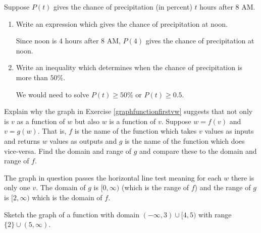 \documentclass{ximera}
\begin{document}
\begin{problem}
Suppose $P(t)$ gives the chance of precipitation (in percent)  $t$ hours after 8 AM.

\begin{enumerate}

\item  Write an expression which gives the chance of precipitation at noon.

\begin{solution}
Since noon is $4$ hours after 8 AM, $P(4)$ gives the chance of precipitation at noon.
\end{solution}

\item  Write an inequality which determines when the chance of precipitation is more than $50 \%$.

\begin{solution}
We would need to solve $P(t) \geq 50 \%$ or $P(t) \geq 0.5$.
\end{solution}

\end{enumerate}
\end{problem}

\begin{problem}
Explain why the graph in  Exercise \ref{graphfunctionfirstvw}  suggests that not only is $v$ as a function of $w$ but also $w$ is a function of $v$.  Suppose $w = f(v)$ and $v = g(w)$.  That is, $f$ is the name of the function which takes $v$ values as inputs and returns $w$ values as outputs and $g$ is the name of the function which does vice-versa.   Find the domain and range of  $g$ and compare these to the domain and range of $f$.

\begin{solution}
The graph in question passes the horizontal line test meaning for each $w$ there is only one $v$.    The domain of $g$ is $[0, \infty)$ (which is the range of $f$) and the range of $g$ is $[2, \infty)$ which is the domain of $f$.  
\end{solution}
\end{problem}

\begin{problem}
Sketch the graph of a function with domain $(-\infty, 3) \cup [4,5)$ with range $\{ 2 \} \cup (5, \infty)$.
\end{problem}
\end{document}
